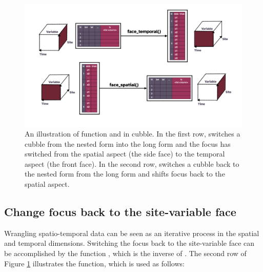\documentclass[
]{jss}
\begin{document}
\begin{CodeChunk}
\begin{figure}

{\centering \includegraphics[width=1\linewidth]{../figures/diagram-keynotes/diagram-keynotes.008} 

}

\caption{An illustration of function  and  in cubble. In the first row,  switches a cubble from the nested form into the long form and the focus has switched from the spatial aspect (the side face) to the temporal aspect (the front face). In the second row,  switches a cubble back to the nested form from the long form and shifts focus back to the spatial aspect.}\label{fig:face}
\end{figure}
\end{CodeChunk}

\hypertarget{change-focus-back-to-the-site-variable-face}{%
\subsection{Change focus back to the site-variable face}\label{change-focus-back-to-the-site-variable-face}}

Wrangling spatio-temporal data can be seen as an iterative process in the spatial and temporal dimensions. Switching the focus back to the site-variable face can be accomplished by the function , which is the inverse of . The second row of Figure \ref{fig:face} illustrates the function, which is used as follows:
\end{document}
